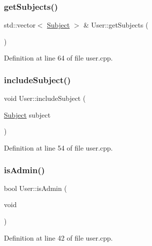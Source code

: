 \mbox{\label{class_user_ac31e6c1c46e39361b20be3e92b67085b}} 
\subsubsection{\texorpdfstring{get\+Subjects()}{getSubjects()}}
{\footnotesize\ttfamily std\+::vector$<$ \hyperlink{class_subject}{Subject} $>$ \& User\+::get\+Subjects (\begin{DoxyParamCaption}{ }\end{DoxyParamCaption})}



Definition at line 64 of file user.\+cpp.

\mbox{\label{class_user_a4ecbfe6ef4b04825993217a889c64401}} 
\subsubsection{\texorpdfstring{include\+Subject()}{includeSubject()}}
{\footnotesize\ttfamily void User\+::include\+Subject (\begin{DoxyParamCaption}\item[{\hyperlink{class_subject}{Subject}}]{subject }\end{DoxyParamCaption})}



Definition at line 54 of file user.\+cpp.

\mbox{\label{class_user_ad459325546846a729a583db0a3c73f23}} 
\subsubsection{\texorpdfstring{is\+Admin()}{isAdmin()}}
{\footnotesize\ttfamily bool User\+::is\+Admin (\begin{DoxyParamCaption}\item[{void}]{ }\end{DoxyParamCaption})}



Definition at line 42 of file user.\+cpp.

\mbox{\label{class_user_a3b3ce064a0cc1edbca2c475ebcbd9e09}} 
